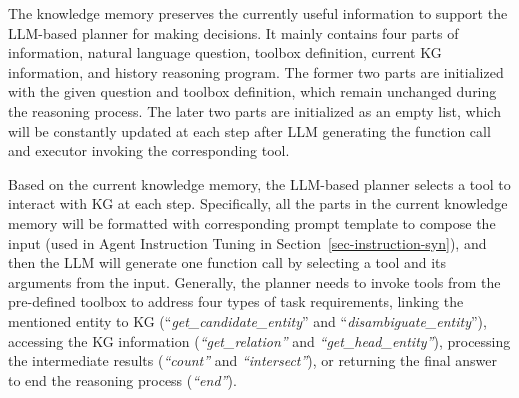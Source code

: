 The knowledge memory preserves the currently useful information to support the LLM-based planner for making decisions.
It mainly contains four parts of information, \ie natural language question, toolbox definition, current KG information, and history reasoning program.
The former two parts are initialized with the given question and toolbox definition, which remain unchanged during the reasoning process.
The later two parts are initialized as an empty list, which will be constantly updated at each step after LLM generating the function call and executor invoking the corresponding tool.

Based on the current knowledge memory, the LLM-based planner selects a tool to interact with KG at each step.
Specifically, all the parts in the current knowledge memory will be formatted with corresponding prompt template to compose the input (used in Agent Instruction Tuning in Section~\ref{sec-instruction-syn}), and then the LLM will generate one function call by selecting a tool and its arguments from the input. 
Generally, the planner needs to invoke tools from the pre-defined toolbox to address four types of task requirements, \ie linking the mentioned entity to KG (\eg ``\emph{get\_candidate\_entity}'' and ``\emph{disambiguate\_entity}''), accessing the KG information (\eg \textit{``get\_relation''} and \textit{``get\_head\_entity''}), processing the intermediate results (\eg \textit{``count''} and \textit{``intersect''}), or returning the final answer to end the reasoning process (\eg \textit{``end''}).


